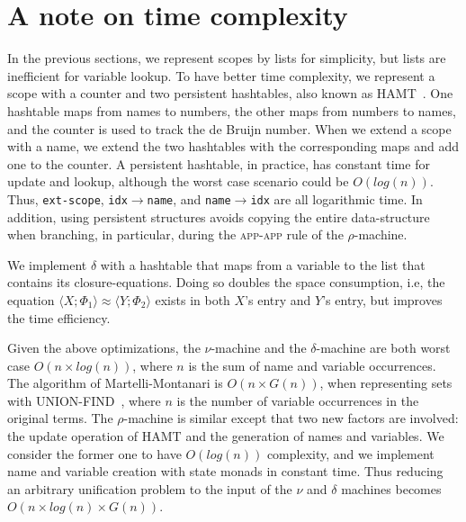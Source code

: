 \documentclass[a4paper,UKenglish]{lipics-v2016}
\newcommand{\clos}[2] {
  \langle #1; #2 \rangle
}
\newcommand{\aeq}[4] {
  \clos{#1}{#2} \approx \clos{#3}{#4}
}
\newcommand*{\transname}[1]{\textsc{#1}}
\begin{document}
\section{A note on time complexity}
    \label{efficiency}

In the previous sections, we represent scopes by lists for simplicity,
but lists are inefficient for variable lookup.  To have better time
complexity, we represent a scope with a counter and two persistent
hashtables, also known as HAMT~\citep{bagwell_ideal_2001}.  One
hashtable maps from names to numbers, the other maps from numbers to
names, and the counter is used to track the de Bruijn number.  When we
extend a scope with a name, we extend the two hashtables with the
corresponding maps and add one to the counter.  A persistent
hashtable, in practice, has constant time for update and lookup,
although the worst case scenario could be $O(log(n))$.  Thus,
\texttt{ext-scope}, \texttt{idx$\rightarrow$name}, and
\texttt{name$\rightarrow$idx} are all logarithmic time.  In addition,
using persistent structures avoids copying the entire data-structure
when branching, in particular, during the \transname{app-app} rule of
the $\rho$-machine.

We implement $\delta$ with a hashtable that maps from a variable to
the list that contains its closure-equations.  Doing so doubles the
space consumption, i.e, the equation $\aeq{X}{\Phi_1}{Y}{\Phi_2}$
exists in both $X$'s entry and $Y$'s entry, but improves the time
efficiency.

Given the above optimizations, the $\nu$-machine and the
$\delta$-machine are both worst case $O(n \times log(n))$,
where $n$ is the sum of name and variable occurrences.
The algorithm of Martelli-Montanari is $O(n \times G(n))$, when
representing sets with UNION-FIND~\citep{tarjan_efficiency_1975}, where
$n$ is the number of variable occurrences in the original terms.  The
$\rho$-machine is similar except that two new factors are involved:
the update operation of HAMT and the generation of names and
variables.  We consider the former one to have $O(log(n))$ complexity,
and we implement name and variable creation with state monads in
constant time.  Thus reducing an arbitrary unification problem to the
input of the $\nu$ and $\delta$ machines becomes $O(n \times log(n) \times
G(n))$.

    \clearpage


\end{document}
